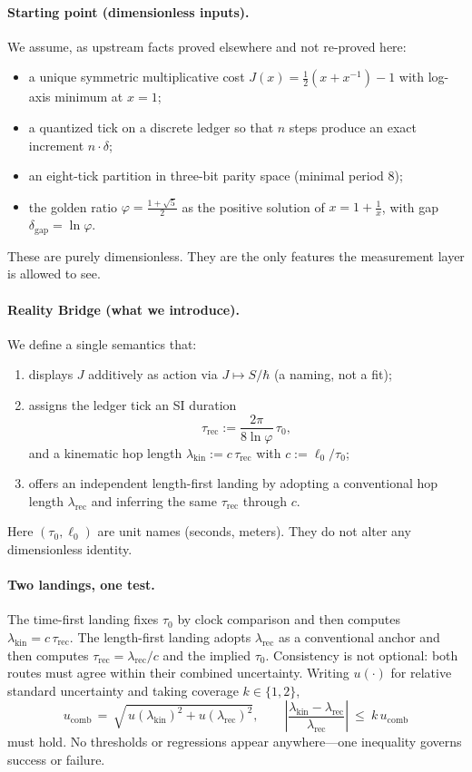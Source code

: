 \documentclass[11pt]{article}
\theoremstyle{plain}
\theoremstyle{definition}
\theoremstyle{remark}
\begin{document}
\paragraph{Starting point (dimensionless inputs).}
We assume, as upstream facts proved elsewhere and not re-proved here:
\begin{itemize}
  \item a unique symmetric multiplicative cost \(J(x)=\tfrac12(x+x^{-1})-1\) with log-axis minimum at \(x=1\);
  \item a quantized tick on a discrete ledger so that \(n\) steps produce an exact increment \(n\cdot\delta\);
  \item an eight-tick partition in three-bit parity space (minimal period \(8\));
  \item the golden ratio \(\varphi=\frac{1+\sqrt{5}}{2}\) as the positive solution of \(x=1+\frac1x\), with gap \(\delta_{\mathrm{gap}}=\ln\varphi\).
\end{itemize}
These are purely dimensionless. They are the only features the measurement layer is allowed to see.

\paragraph{Reality Bridge (what we introduce).}
We define a single semantics that:
\begin{enumerate}
  \item displays \(J\) additively as action via \(J\mapsto S/\hbar\) (a naming, not a fit);
  \item assigns the ledger tick an SI duration
  \[
  \tau_{\mathrm{rec}}:=\frac{2\pi}{8\ln\varphi}\,\tau_{0},
  \]
  and a kinematic hop length \(\lambda_{\mathrm{kin}}:=c\,\tau_{\mathrm{rec}}\) with \(c:=\ell_{0}/\tau_{0}\);
  \item offers an independent length-first landing by adopting a conventional hop length \(\lambda_{\mathrm{rec}}\) and inferring the same \(\tau_{\mathrm{rec}}\) through \(c\).
\end{enumerate}
Here \((\tau_{0},\ell_{0})\) are unit names (seconds, meters). They do not alter any dimensionless identity.

\paragraph{Two landings, one test.}
The time-first landing fixes \(\tau_{0}\) by clock comparison and then computes \(\lambda_{\mathrm{kin}}=c\,\tau_{\mathrm{rec}}\).
The length-first landing adopts \(\lambda_{\mathrm{rec}}\) as a conventional anchor and then computes \(\tau_{\mathrm{rec}}=\lambda_{\mathrm{rec}}/c\) and the implied \(\tau_{0}\).
Consistency is not optional: both routes must agree within their combined uncertainty. Writing \(u(\cdot)\) for relative standard uncertainty and taking coverage \(k\in\{1,2\}\),
\[
u_{\mathrm{comb}}\,=\,\sqrt{\,u(\lambda_{\mathrm{kin}})^{2}+u(\lambda_{\mathrm{rec}})^{2}},\qquad
\left|\frac{\lambda_{\mathrm{kin}}-\lambda_{\mathrm{rec}}}{\lambda_{\mathrm{rec}}}\right|\ \le\ k\,u_{\mathrm{comb}}
\]
must hold. No thresholds or regressions appear anywhere—one inequality governs success or failure.
\end{document}
